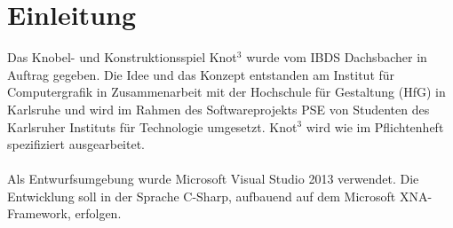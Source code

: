 \chapter{Einleitung}

Das Knobel- und Konstruktionsspiel Knot$^3$ wurde vom IBDS Dachsbacher in Auftrag gegeben. Die Idee und das Konzept entstanden am Institut für Computergrafik in Zusammenarbeit mit der Hochschule für Gestaltung (HfG) in Karlsruhe und wird im Rahmen des Softwareprojekts PSE von Studenten des Karlsruher Instituts für Technologie umgesetzt. Knot$^3$ wird wie im Pflichtenheft spezifiziert ausgearbeitet.
\\\\
Als Entwurfsumgebung wurde Microsoft Visual Studio 2013 verwendet. Die Entwicklung soll in der Sprache C-Sharp, aufbauend auf dem Microsoft XNA-Framework, erfolgen.